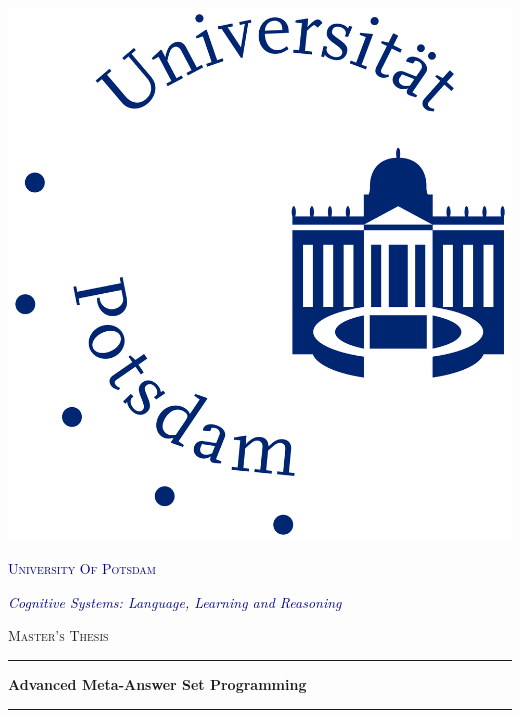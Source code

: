 \begin{titlepage}
    \begin{center}
    
    \begin{center}
      \includegraphics[scale=0.2]{uni-potsdam.jpg}
    \end{center}
    \vspace*{.008\textheight}
    {\scshape\LARGE \textcolor{darkblue}{University Of Potsdam}\par}
    
    \large 
    \textcolor{darkblue}{\emph{Cognitive Systems: Language, Learning and Reasoning}}
    
    \vspace{1.5cm}
    \textsc{\Large Master's Thesis}\\[0.5cm]
    
    \noindent\rule{\textwidth}{0.3mm}
    {\huge \bfseries Advanced Meta-Answer Set Programming\par}\vspace{0.4cm}
    \noindent\rule{\textwidth}{0.3mm}
     

\end{center}
\end{titlepage}
